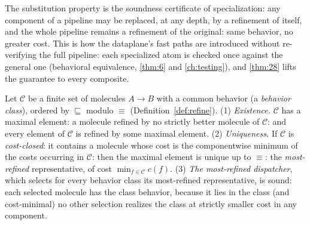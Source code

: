 \begin{remark}
The substitution property is the soundness certificate of specialization: any
component of a pipeline may be replaced, at any depth, by a refinement of
itself, and the whole pipeline remains a refinement of the original: same
behavior, no greater cost. This is how the dataplane's fast paths are
introduced without re-verifying the full pipeline: each specialized atom is
checked once against the general one (behavioral equivalence, \autoref{thm:6} and
\autoref{ch:testing}), and \autoref{thm:28} lifts the guarantee to every composite.
\end{remark}

\begin{theorem}\label{thm:29}
 Let $\mathcal{C}$ be a finite set of molecules
$A \to B$ with a common behavior (a \emph{behavior class}), ordered by
$\sqsubseteq$ modulo $\equiv$ (Definition~\ref{def:refine}).
(1) \emph{Existence.} $\mathcal{C}$ has a maximal element: a molecule
refined by no strictly better molecule of $\mathcal{C}$: and every element
of $\mathcal{C}$ is refined by some maximal element.
(2) \emph{Uniqueness.} If $\mathcal{C}$ is \emph{cost-closed}: it contains
a molecule whose cost is the componentwise minimum of the costs occurring in
$\mathcal{C}$: then the maximal element is unique up to $\equiv$: the
\emph{most-refined} representative, of cost $\min_{f \in \mathcal{C}} c (f)$.
(3) \emph{The most-refined dispatcher}, which selects for every behavior class
its most-refined representative, is sound: each selected molecule has the
class behavior, because it lies in the class (and cost-minimal) no other
selection realizes the class at strictly smaller cost in any component.
\end{theorem}

